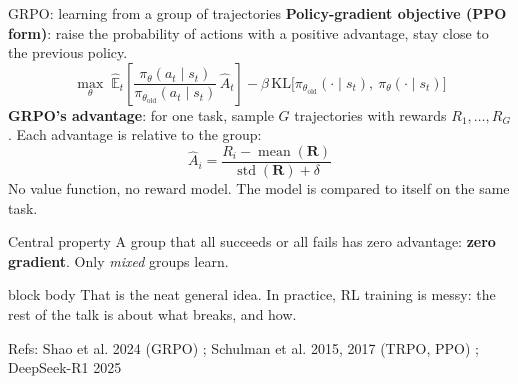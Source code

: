 \documentclass[aspectratio=169,10pt]{beamer}
\newcommand{\refs}[1]{\vfill{\tiny\textcolor{crMid}{Refs: #1}}}
\newenvironment{keymsg}{\begin{beamercolorbox}[sep=6pt,wd=\textwidth]{block body}\small}{\end{beamercolorbox}}
\begin{document}
\begin{frame}{GRPO: learning from a group of trajectories}
\small
\textbf{Policy-gradient objective (PPO form)}: raise the probability of actions with a positive advantage, stay close to the previous policy.
\[ \max_\theta\; \hat{\mathbb E}_t\!\left[\frac{\pi_\theta(a_t \mid s_t)}{\pi_{\theta_{\text{old}}}(a_t \mid s_t)}\,\hat A_t\right] - \beta\, \mathrm{KL}\big[\pi_{\theta_{\text{old}}}(\cdot \mid s_t),\ \pi_\theta(\cdot \mid s_t)\big] \]
\vspace{0.1cm}
\textbf{GRPO's advantage}: for one task, sample $G$ trajectories with rewards $R_1,\dots,R_G$. Each advantage is relative to the group:
\[ \hat A_i = \frac{R_i - \operatorname{mean}(\mathbf R)}{\operatorname{std}(\mathbf R)+\delta} \]
No value function, no reward model. The model is compared to itself on the same task.
\vspace{0.15cm}
\begin{block}{Central property}
A group that all succeeds or all fails has zero advantage: \textbf{zero gradient}. Only \emph{mixed} groups learn.
\end{block}
\vspace{0.1cm}
\begin{keymsg}
That is the neat general idea. In practice, RL training is messy: the rest of the talk is about what breaks, and how.
\end{keymsg}
\refs{Shao et al. 2024 (GRPO) ; Schulman et al. 2015, 2017 (TRPO, PPO) ; DeepSeek-R1 2025}
\end{frame}
\end{document}
